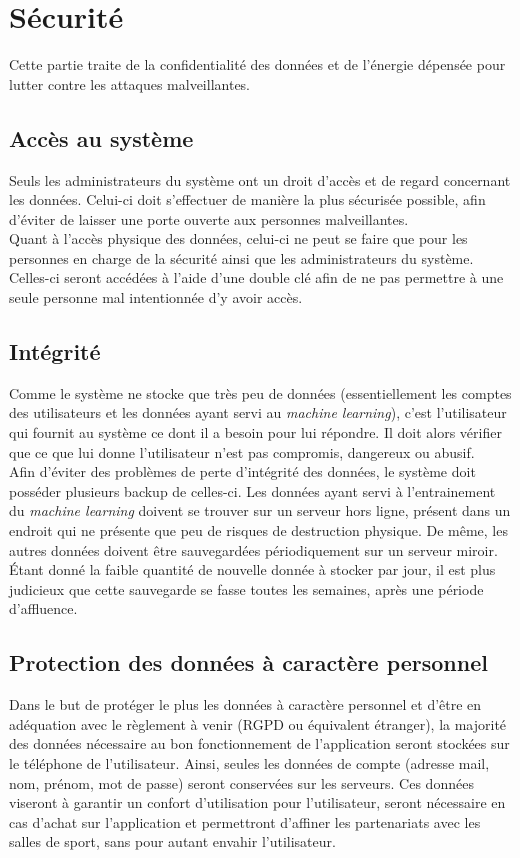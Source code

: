 \section{Sécurité}
Cette partie traite de la confidentialité des données et de l'énergie dépensée pour lutter contre les attaques malveillantes.

\subsection*{Accès au système}
Seuls les administrateurs du système ont un droit d'accès et de regard concernant les données. Celui-ci doit s'effectuer de manière la plus sécurisée possible, afin d'éviter de laisser une porte ouverte aux personnes malveillantes.\\

Quant à l'accès physique des données, celui-ci ne peut se faire que pour les personnes en charge de la sécurité ainsi que les administrateurs du système. Celles-ci seront accédées à l'aide d'une double clé afin de ne pas permettre à une seule personne mal intentionnée d'y avoir accès.

\subsection*{Intégrité}
Comme le système ne stocke que très peu de données (essentiellement les comptes des utilisateurs et les données ayant servi au \textit{machine learning}), c'est l'utilisateur qui fournit au système ce dont il a besoin pour lui répondre. Il doit alors vérifier que ce que lui donne l'utilisateur n'est pas compromis, dangereux ou abusif.\\

Afin d'éviter des problèmes de perte d'intégrité des données, le système doit posséder plusieurs backup de celles-ci. Les données ayant servi à l'entrainement du \textit{machine learning} doivent se trouver sur un serveur hors ligne, présent dans un endroit qui ne présente que peu de risques de destruction physique. De même, les autres données doivent être sauvegardées périodiquement sur un serveur miroir. \'Etant donné la faible quantité de nouvelle donnée à stocker par jour, il est plus judicieux que cette sauvegarde se fasse toutes les semaines, après une période d'affluence.

\subsection*{Protection des données à caractère personnel}
Dans le but de protéger le plus les données à caractère personnel et d'être en adéquation avec le règlement à venir (RGPD ou équivalent étranger), la majorité des données nécessaire au bon fonctionnement de l'application seront stockées sur le téléphone de l'utilisateur. Ainsi, seules les données de compte (adresse mail, nom, prénom, mot de passe) seront conservées sur les serveurs. Ces données viseront à garantir un confort d'utilisation pour l'utilisateur, seront nécessaire en cas d'achat sur l'application et permettront d'affiner les partenariats avec les salles de sport, sans pour autant envahir l'utilisateur.\\

